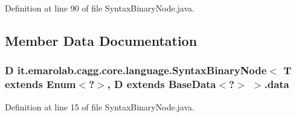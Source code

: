 Definition at line 90 of file Syntax\-Binary\-Node.\-java.



\subsection{Member Data Documentation}
\hypertarget{classit_1_1emarolab_1_1cagg_1_1core_1_1language_1_1SyntaxBinaryNode_3_01T_01extends_01Enum_3_04_6f6f52bca8b05a51e94968cedaccd1f1_aba625b314880e275f09984235373f5ef}{
\subsubsection[{data}]{\setlength{\rightskip}{0pt plus 5cm}D it.\-emarolab.\-cagg.\-core.\-language.\-Syntax\-Binary\-Node$<$ T extends Enum$<$?$>$, D extends Base\-Data$<$?$>$ $>$.data\hspace{0.3cm}{\ttfamily [private]}}}\label{classit_1_1emarolab_1_1cagg_1_1core_1_1language_1_1SyntaxBinaryNode_3_01T_01extends_01Enum_3_04_6f6f52bca8b05a51e94968cedaccd1f1_aba625b314880e275f09984235373f5ef}


Definition at line 15 of file Syntax\-Binary\-Node.\-java.

